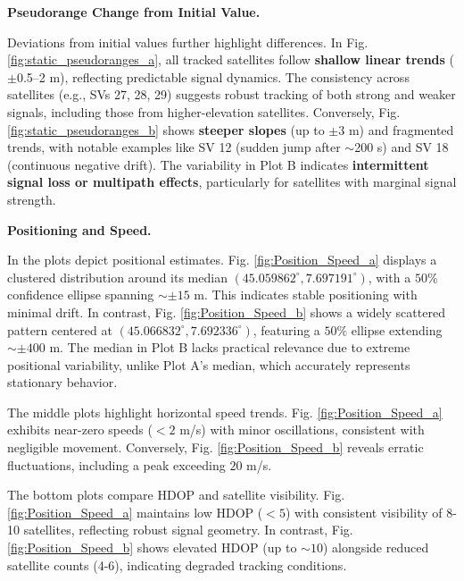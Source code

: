         \vspace{0.5em}
        \noindent \textbf{Pseudorange Change from Initial Value.}
        
        \noindent Deviations from initial values further highlight differences. 
        In Fig. \ref{fig:static_pseudoranges_a}, all tracked satellites follow \textbf{shallow linear trends} ($\pm$0.5--2 m), reflecting predictable signal dynamics. 
        The consistency across satellites (e.g., SVs 27, 28, 29) suggests robust tracking of both strong and weaker signals, including those from higher-elevation satellites. 
        Conversely, Fig. \ref{fig:static_pseudoranges_b} shows \textbf{steeper slopes} (up to $\pm$3 m) and fragmented trends, with notable examples like SV 12 (sudden jump after $\sim$200 s) and SV 18 (continuous negative drift). 
        The variability in Plot B indicates \textbf{intermittent signal loss or multipath effects}, particularly for satellites with marginal signal strength. 
    
        \vspace{0.5em}
        \noindent \textbf{Positioning and Speed.}
        
        \noindent In the plots depict positional estimates. 
        Fig. \ref{fig:Position_Speed_a} displays a clustered distribution around its median $(45.059862^\circ, 7.697191^\circ)$, with a $50\%$ confidence ellipse spanning $\sim \pm 15$ m. 
        This indicates stable positioning with minimal drift. 
        In contrast, Fig. \ref{fig:Position_Speed_b} shows a widely scattered pattern centered at $(45.066832^\circ, 7.692336^\circ)$, featuring a $50\%$ ellipse extending $\sim \pm 400$ m. 
        The median in Plot B lacks practical relevance due to extreme positional variability, unlike Plot A's median, which accurately represents stationary behavior.  

        \noindent The middle plots highlight horizontal speed trends. 
        Fig. \ref{fig:Position_Speed_a} exhibits near-zero speeds ($<2$ m/s) with minor oscillations, consistent with negligible movement. 
        Conversely, Fig. \ref{fig:Position_Speed_b} reveals erratic fluctuations, including a peak exceeding $20$ m/s.

        \noindent The bottom plots compare HDOP and satellite visibility. 
        Fig. \ref{fig:Position_Speed_a} maintains low HDOP ($<5$) with consistent visibility of 8-10 satellites, reflecting robust signal geometry. 
        In contrast, Fig. \ref{fig:Position_Speed_b} shows elevated HDOP (up to $\sim 10$) alongside reduced satellite counts (4-6), indicating degraded tracking conditions.

